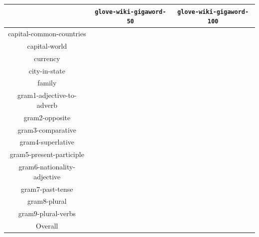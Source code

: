 \documentclass{article}
\begin{document}
\begin{enumerate}
\begin{enumerate}
        \begin{center}
            \hspace*{-1cm}\begin{tabular}{c||c|c|}
             & \texttt{glove-wiki-gigaword-50} & \texttt{glove-wiki-gigaword-100} \\ \hline \hline
            capital-common-countries & & \\ \hline
            capital-world & & \\ \hline
            currency & & \\ \hline
            city-in-state & & \\ \hline
            family & & \\ \hline
            gram1-adjective-to-adverb & & \\ \hline
            gram2-opposite & & \\ \hline
            gram3-comparative & & \\ \hline
            gram4-superlative & & \\ \hline
            gram5-present-participle & & \\ \hline
            gram6-nationality-adjective & & \\ \hline
            gram7-past-tense & & \\ \hline
            gram8-plural & & \\ \hline
            gram9-plural-verbs & & \\ \hline
            Overall & & \\ \hline
            \end{tabular}
        \end{center}
    \end{enumerate} 
\end{enumerate}
\end{document}
